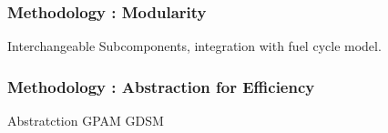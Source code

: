 
\begin{frame}[ctb!]
  \frametitle{Methodology : Modularity }
  Interchangeable Subcomponents, integration with fuel cycle model.
\end{frame}

\begin{frame}[ctb!]
  \frametitle{Methodology : Abstraction for Efficiency}
  Abstratction
  GPAM
  GDSM
\end{frame}
